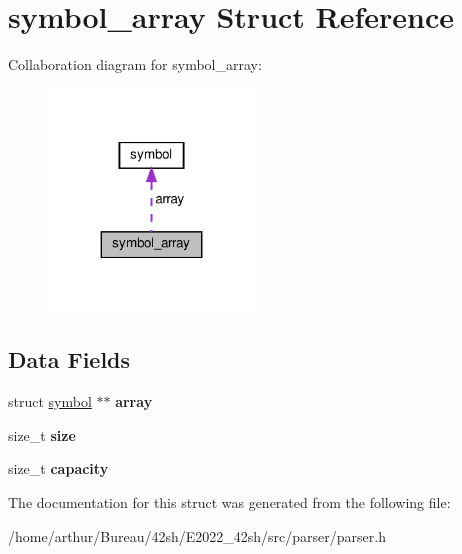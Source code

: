 \hypertarget{structsymbol__array}{}\section{symbol\+\_\+array Struct Reference}
\label{structsymbol__array}


Collaboration diagram for symbol\+\_\+array\+:
\nopagebreak
\begin{figure}[H]
\begin{center}
\leavevmode
\includegraphics[width=155pt]{structsymbol__array__coll__graph}
\end{center}
\end{figure}
\subsection*{Data Fields}
\begin{DoxyCompactItemize}
\item 
\mbox{\label{structsymbol__array_ae79076ce42ef6eb8fb7a2ca6270fae71}} 
struct \hyperlink{structsymbol}{symbol} $\ast$$\ast$ {\bfseries array}
\item 
\mbox{\label{structsymbol__array_a854352f53b148adc24983a58a1866d66}} 
size\+\_\+t {\bfseries size}
\item 
\mbox{\label{structsymbol__array_ad721fc6ca6a3d6ba3bc506576622aab0}} 
size\+\_\+t {\bfseries capacity}
\end{DoxyCompactItemize}


The documentation for this struct was generated from the following file\+:\begin{DoxyCompactItemize}
\item 
/home/arthur/\+Bureau/42sh/\+E2022\+\_\+42sh/src/parser/parser.\+h\end{DoxyCompactItemize}
